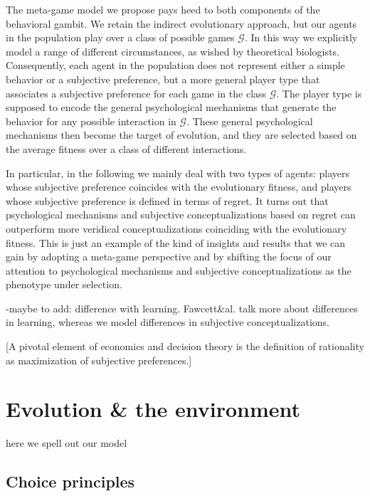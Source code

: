 \documentclass[fleqn,reqno,11pt]{article}
\begin{document}
The meta-game model we propose pays heed to both components of the behavioral gambit. We retain the indirect evolutionary approach, but our agents in the population play over a class of possible games $\mathcal{G}$. In this way we explicitly model a range of different circumstances, as wished by theoretical biologists.  Consequently, each agent in the population does not represent either a simple behavior or a subjective preference, but a more general player type that associates a subjective preference for each game in the class $\mathcal{G}$. The player type is supposed to encode the general psychological mechanisms that generate the behavior for any possible interaction in $\mathcal{G}$. These general psychological mechanisms then become the target of evolution, and they are selected based on the average fitness over a class of different interactions. 

In particular, in the following we mainly deal with two types of agents: players whose subjective preference coincides with the evolutionary fitness, and players whose subjective preference is defined in terms of regret. It turns out that psychological mechanisms and subjective conceptualizations based on regret can outperform more veridical conceptualizations coinciding with the evolutionary fitness.
This is just an example of the kind of insights and results that we can gain by adopting a meta-game perspective and by shifting the focus of our attention to psychological mechanisms and subjective conceptualizations as the phenotype under selection.


-maybe to add: difference with learning. Fawcett\&al. talk more about differences in learning, whereas we model differences in subjective conceptualizations.


[A pivotal element of economics and decision theory is the definition of rationality as
maximization of subjective preferences.]



\section{Evolution \& the environment}

here we spell out our model

\subsection{Choice principles}
\end{document}
